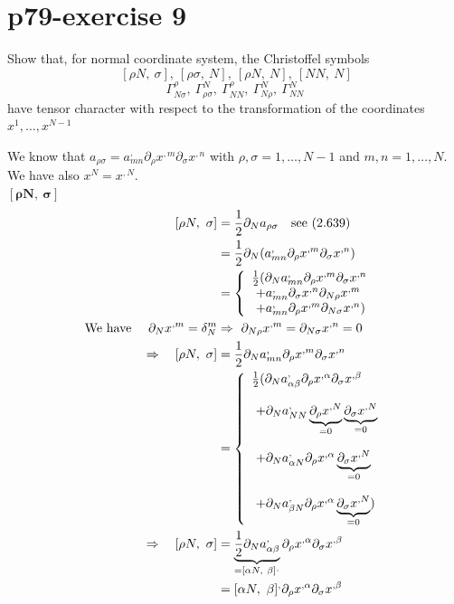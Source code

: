 \section{p79-exercise 9}
\begin{tcolorbox}
Show that, for normal coordinate system, the Christoffel symbols $$ \ [ \rho N, \  \sigma], \ [\rho \sigma, \ N  ], \ [\rho N, \ N], \ [N N, \  N]$$
$$\Gamma^{\rho}_{N \sigma},\ \Gamma^{N}_{\rho \sigma},\ \Gamma^{\rho}_{N N}, \ \Gamma^{N}_{N \rho}, \ \Gamma^{N}_{N N}$$ have tensor character with respect to the transformation of the coordinates $x^1, \dots , x^{N-1}$
\end{tcolorbox}
We know that $a_{\rho \sigma} = a^{,}_{mn}\partial_{\rho}x^{,m}\partial_{\sigma}x^{,n}$ with $\rho , \sigma = 1, \dots, N-1$ and $m , n = 1, \dots, N$. We have also $x^N = x^{,N}$.\\
$\boldsymbol{[ \rho N, \  \sigma]}$
\begin{align}
\ [ \rho N, \  \sigma] &= \half \partial_N a_{\rho \sigma}\quad \text{see (2.639)}\\
\ &= \half \partial_N (a^{,}_{mn}\partial_{\rho}x^{,m}\partial_{\sigma}x^{,n})\\
\ & = \left\{ \begin{array}{l}
\half (\partial_N a^{,}_{mn}\partial_{\rho}x^{,m}\partial_{\sigma}x^{,n}\\
\ + a^{,}_{mn} \partial_{\sigma}x^{,n} \partial_{N \rho}x^{,m}\\
\ + a^{,}_{mn} \partial_{\rho}x^{,m} \partial_{N \sigma}x^{,n})
\end{array} \right.\\
\text{We have  }\quad \partial_{N }x^{,m} = \delta^m_N & \Rightarrow \ \partial_{N \rho}x^{,m}= \partial_{N \sigma}x^{,n} = 0\\
\Rightarrow \quad [ \rho N, \  \sigma] &= \half \partial_N a^{,}_{mn}\partial_{\rho}x^{,m}\partial_{\sigma}x^{,n}\\
\ &= \left\{ \begin{array}{l}
\half (\partial_N a^{,}_{\alpha\beta}\partial_{\rho}x^{,\alpha}\partial_{\sigma}x^{,\beta}\\\\
\ +\partial_N a^{,}_{NN}\underbrace{\partial_{\rho}x^{,N}}_{=0}\underbrace{\partial_{\sigma}x^{,N}}_{=0}\\\\
\ +\partial_N a^{,}_{\alpha N}\partial_{\rho}x^{,\alpha}\underbrace{\partial_{\sigma}x^{,N}}_{=0}\\\\
\ +\partial_N a^{,}_{\beta N}\partial_{\rho}x^{,\alpha}\underbrace{\partial_{\sigma}x^{,N}}_{=0})\\
\end{array} \right.\\
\Rightarrow \quad [ \rho N, \  \sigma] &=  \underbrace{\half \partial_N a^{,}_{\alpha\beta}}_{= [\alpha N, \ \beta]^{,}}\partial_{\rho}x^{,\alpha}\partial_{\sigma}x^{,\beta}\\
&= [\alpha N, \ \beta]^{,}\partial_{\rho}x^{,\alpha}\partial_{\sigma}x^{,\beta}
\end{align}
